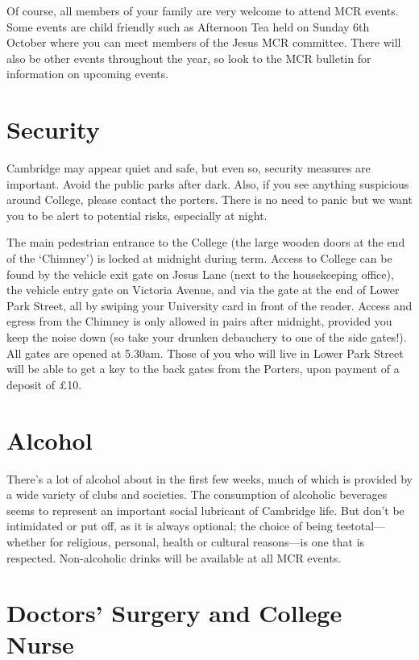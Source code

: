 \documentclass[11pt,fleqn, oneside]{book} %
\begin{document}
Of course, all members of your family are very welcome to attend MCR events.  Some events are child friendly such as Afternoon Tea held on Sunday 6th October where you can meet members of the Jesus MCR committee. There will also be other events throughout the year, so look to the MCR bulletin for information on upcoming events.
   
\section{Security}
   
Cambridge may appear quiet and safe, but even so, security measures are important. Avoid the public parks after dark. Also, if you see anything suspicious around College, please contact the porters. There is no need to panic but we want you to be alert to potential risks, especially at night.
   
The main pedestrian entrance to the College (the large wooden doors at the end of the ‘Chimney’) is locked at midnight during term. Access to College can be found by the vehicle exit gate on Jesus Lane (next to the housekeeping office), the vehicle entry gate on Victoria Avenue, and via the gate at the end of Lower Park Street, all by swiping your University card in front of the reader. Access and egress from the Chimney is only allowed in pairs after midnight, provided you keep the noise down (so take your drunken debauchery to one of the side gates!). All gates are opened at 5.30am. Those of you who will live in Lower Park Street will be able to get a key to the back gates from the Porters, upon payment of a deposit of \pounds{10}. 
   
\section{Alcohol}
   
There's a lot of alcohol about in the first few weeks, much of which is provided by a wide variety of clubs and societies. The consumption of alcoholic beverages seems to represent an important social lubricant of Cambridge life. But don't be intimidated or put off, as it is always optional; the choice of being teetotal—whether for religious, personal, health or cultural reasons—is one that is respected. Non-alcoholic drinks will be available at all MCR events. 
   
\section{Doctors’ Surgery and College Nurse}
   
\end{document}

